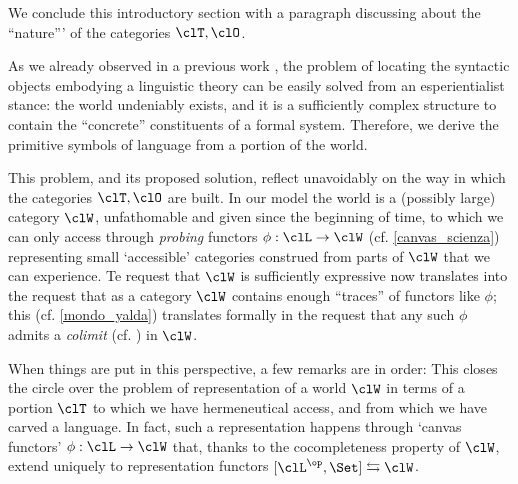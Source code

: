 \medskip
We conclude this introductory section with a paragraph discussing about the ``nature''' of the categories $\clT,\clO$.

As we already observed in a previous work \cite{catont1}, the problem of locating the syntactic objects embodying a linguistic theory can be easily solved from an esperientialist stance: the world undeniably exists, and it is a sufficiently complex structure to contain the ``concrete'' constituents of a formal system. Therefore, we derive the primitive symbols of language from a portion of the world.

This problem, and its proposed solution, reflect unavoidably on the way in which the categories $\clT,\clO$ are built. In our model the world is a (possibly large) category $\clW$, unfathomable and given since the beginning of time, to which we can only access through \emph{probing} functors $\phi : \clL \to \clW$ (cf. \autoref{canvas_scienza}) representing small `accessible' categories construed from parts of $\clW$ that we can experience. Te request that $\clW$ is sufficiently expressive now translates into the request that as a category $\clW$ contains enough ``traces'' of functors like $\phi$; this (cf. \autoref{mondo_yalda}) translates formally in the request that any such $\phi$ admits a \emph{colimit} (cf. \cite[Ch. 2]{Bor1}) in $\clW$.

When things are put in this perspective, a few remarks are in order: 
This closes the circle over the problem of representation of a world $\clW$ in terms of a portion $\clT$ to which we have hermeneutical access, and from which we have carved a language. In fact, such a representation happens through `canvas functors' $\phi : \clL \to \clW$ that, thanks to the cocompleteness property of $\clW$, extend uniquely to representation functors $[\clL^\op,\Set] \leftrightarrows \clW$. 

